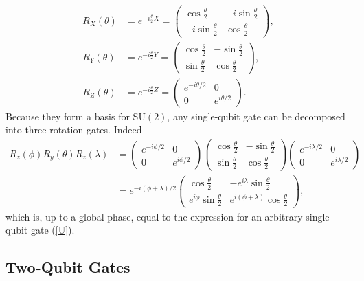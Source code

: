 \documentclass[Dual]{msu-thesis}
\begin{document}
\begin{align}
R_X(\theta)
&=
e^{-i\frac{\theta}{2}X}
=
\begin{pmatrix}
\cos\frac{\theta}{2} & -i\sin\frac{\theta}{2} \\
-i\sin\frac{\theta}{2} & \cos\frac{\theta}{2} 
\end{pmatrix},
\\
R_Y(\theta)
&=
e^{-i\frac{\theta}{2}Y}
=
\begin{pmatrix}
\cos\frac{\theta}{2} & -\sin\frac{\theta}{2} \\
\sin\frac{\theta}{2} & \cos\frac{\theta}{2} 
\end{pmatrix},
\\
R_Z(\theta)
&=
e^{-i\frac{\theta}{2}Z}
=
\begin{pmatrix}
e^{-i\theta/2} & 0 \\
0 & e^{i\theta/2}
\end{pmatrix}
.\end{align}
Because they form a basis for $\text{SU}(2)$, any single-qubit gate can be decomposed into three rotation gates. Indeed
\begin{align}
R_z(\phi)R_y(\theta)R_z(\lambda)
&=
\begin{pmatrix}
e^{-i\phi/2} & 0 \\
0 & e^{i\phi/2}
\end{pmatrix}
\begin{pmatrix}
\cos\frac{\theta}{2} & -\sin\frac{\theta}{2} \\
\sin\frac{\theta}{2} & \cos\frac{\theta}{2} 
\end{pmatrix}
\begin{pmatrix}
e^{-i\lambda/2} & 0 \\
0 & e^{i\lambda/2}
\end{pmatrix}
\\
&=
e^{-i(\phi+\lambda)/2}
\begin{pmatrix}
\cos\frac{\theta}{2} & -e^{i\lambda}\sin\frac{\theta}{2}
\\
e^{i\phi}\sin\frac{\theta}{2} & e^{i(\phi+\lambda)}\cos\frac{\theta}{2}
\end{pmatrix}
,\end{align}
which is, up to a global phase, equal to the expression for an arbitrary single-qubit gate (\ref{U}).

\subsection{Two-Qubit Gates}
\end{document}
